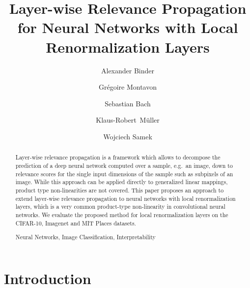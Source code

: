 \documentclass[runningheads,a4paper]{llncs}
\newcommand{\keywords}[1]{\par\addvspace\baselineskip
\noindent\keywordname\enspace\ignorespaces#1}
\begin{document}
\mainmatter  %

\title{Layer-wise Relevance Propagation for Neural Networks with Local Renormalization Layers}


\author{Alexander Binder \and Gr\'egoire Montavon \and Sebastian Bach \and \mbox{Klaus-Robert M{\"u}ller} \and Wojciech Samek}

\maketitle

\begin{abstract}
Layer-wise relevance propagation is a framework which allows to decompose the prediction of a deep neural network computed over a sample, e.g.~an image, down to relevance scores for the single input dimensions of the sample such as subpixels of an image. While this approach can be applied directly to generalized linear mappings, product type non-linearities are not covered. This paper proposes an approach to extend layer-wise relevance propagation to neural networks with local renormalization layers, which is a very common product-type non-linearity in convolutional neural networks. We evaluate the proposed method for local renormalization layers on the CIFAR-10, Imagenet and MIT Places datasets.
\keywords{Neural Networks, Image Classification, Interpretability}
\end{abstract}

\section{Introduction}
\end{document}
